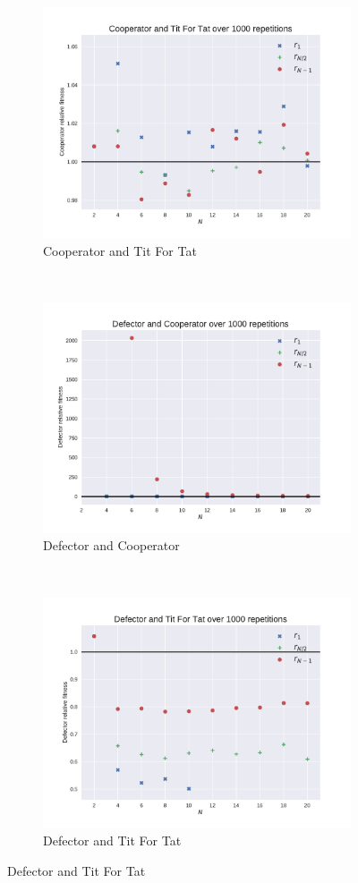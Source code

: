 \documentclass{article}
\begin{document}
\begin{figure}[!hbtp]
    \begin{subfigure}[t]{.3\textwidth}
        \centering
        \includegraphics[width=.8\textwidth]{./img/Cooperator_v_Tit_For_Tat_fitness.pdf}
        \caption{Cooperator and Tit For Tat}
    \end{subfigure}%
    ~
    \begin{subfigure}[t]{.3\textwidth}
        \centering
        \includegraphics[width=.8\textwidth]{./img/Defector_v_Cooperator_fitness.pdf}
        \caption{Defector and Cooperator}
    \end{subfigure}%
    ~
    \begin{subfigure}[t]{.3\textwidth}
        \centering
        \includegraphics[width=.8\textwidth]{./img/Defector_v_Tit_For_Tat_fitness.pdf}
        \caption{Defector and Tit For Tat}
    \end{subfigure}%


\end{figure}
\end{document}
